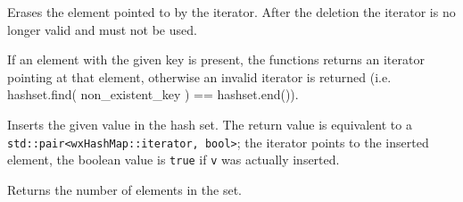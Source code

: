 

Erases the element pointed to by the iterator. After the deletion
the iterator is no longer valid and must not be used.

\label{wxhashsetfind}



If an element with the given key is present, the functions returns
an iterator pointing at that element, otherwise an invalid iterator
is returned (i.e. hashset.find( non\_existent\_key ) == hashset.end()).

\label{wxhashsetinsert}


Inserts the given value in the hash set. The return value is
equivalent to a \texttt{std::pair<wxHashMap::iterator, bool>};
the iterator points to the inserted element, the boolean value
is \texttt{true} if \texttt{v} was actually inserted.

\label{wxhashsetsize}


Returns the number of elements in the set.

